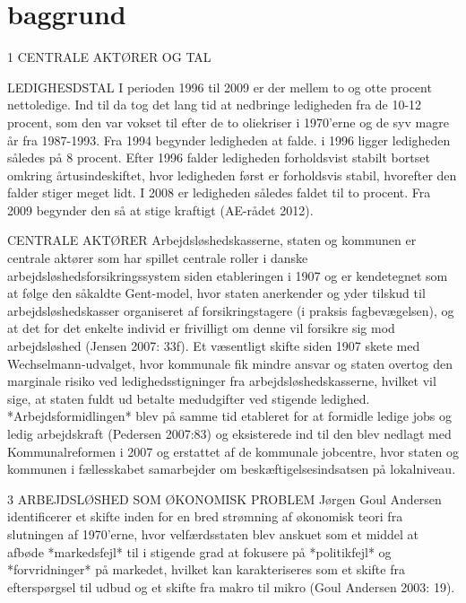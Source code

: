 
\chapter{baggrund} \label{baggrund}


1 CENTRALE AKTØRER OG TAL

LEDIGHESDSTAL
I perioden 1996 til 2009 er der mellem to og otte procent nettoledige. Ind til da tog det lang tid at nedbringe ledigheden fra de 10-12 procent, som den var vokset til efter de to oliekriser i 1970’erne og de syv magre år fra 1987-1993. Fra 1994 begynder ledigheden at falde. i 1996 ligger ledigheden således på 8 procent. Efter 1996 falder ledigheden forholdsvist stabilt bortset omkring årtusindeskiftet, hvor ledigheden først er forholdsvis stabil, hvorefter den falder stiger meget lidt. I 2008 er ledigheden således faldet til to procent. Fra 2009 begynder den så at stige kraftigt (AE-rådet 2012).

CENTRALE AKTØRER
Arbejdsløshedskasserne, staten og kommunen er centrale aktører som har spillet centrale roller i  danske arbejdsløshedsforsikringssystem siden etableringen i 1907 og er kendetegnet som at følge den såkaldte Gent-model, hvor staten anerkender og yder tilskud til arbejdsløshedskasser organiseret af forsikringstagere (i praksis fagbevægelsen), og at det for det enkelte individ er frivilligt om denne vil forsikre sig mod arbejdsløshed (Jensen 2007: 33f). Et væsentligt skifte siden 1907 skete med Wechselmann-udvalget, hvor kommunale fik mindre ansvar og staten overtog den marginale risiko ved ledighedsstigninger fra arbejdsløshedskasserne, hvilket vil sige, at staten fuldt ud betalte medudgifter ved stigende ledighed. *Arbejdsformidlingen* blev på samme tid etableret for at formidle ledige jobs og ledig arbejdskraft (Pedersen 2007:83) og eksisterede ind til den blev nedlagt med Kommunalreformen i 2007 og erstattet af de kommunale jobcentre, hvor staten og kommunen i fællesskabet samarbejder om beskæftigelsesindsatsen på lokalniveau.




3 ARBEJDSLØSHED SOM ØKONOMISK PROBLEM
Jørgen Goul Andersen identificerer et skifte inden for en bred strømning af økonomisk teori fra slutningen af 1970'erne, hvor velfærdsstaten blev anskuet som et middel at afbøde *markedsfejl* til i stigende grad at fokusere på *politikfejl* og *forvridninger* på markedet, hvilket kan karakteriseres som et skifte fra efterspørgsel til udbud og et skifte fra makro til mikro (Goul Andersen 2003: 19).

